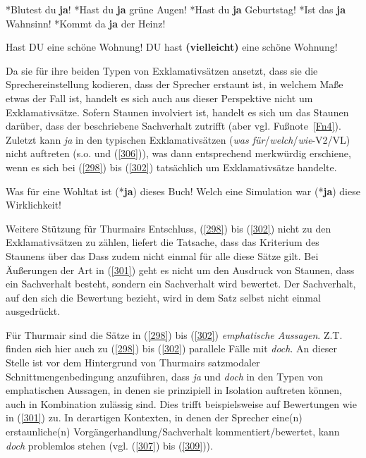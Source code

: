 \begin{exe}
	\ex\label{304} 
		\begin{xlist}	
			\ex\label{304a} *Blutest du \textbf{ja}!	
			\ex\label{304b} *Hast du \textbf{ja} grüne Augen!
			\ex\label{304c} *Hast du \textbf{ja} Geburtstag!
			\ex\label{304d} *Ist das \textbf{ja} Wahnsinn!
			\ex\label{304e} *Kommt da \textbf{ja} der Heinz!
		\end{xlist}
\end{exe}
\begin{exe}
	\ex\label{305} 
		\begin{xlist}	
			\ex\label{305a} Hast DU eine schöne Wohnung!	
			\ex\label{305b} DU hast \textbf{(vielleicht)} eine schöne Wohnung!
		\end{xlist}
\end{exe}
Da sie für ihre beiden Typen von Exklamativsätzen  ansetzt, dass sie die Sprecher\-einstellung kodieren, dass der Sprecher erstaunt ist, in welchem Maße etwas der Fall ist, handelt es sich auch aus dieser Perspektive nicht um Exklamativsätze. Sofern Staunen involviert ist, handelt es sich um das Staunen darüber, dass der beschriebene Sachverhalt zutrifft (aber vgl. Fußnote~\ref{Fn4}). Zuletzt kann \textit{ja} in den typi\-schen Exklamativsätzen (\textit{was für}/\textit{welch}/\textit{wie}-V2/VL) nicht auftreten (s.o. und (\ref{306})), was dann entsprechend merkwürdig erschiene, wenn es sich bei (\ref{298}) bis (\ref{302}) tatsächlich um Exklamativsätze handelte.

\begin{exe}
	\ex\label{306} 
		\begin{xlist}	
			\ex\label{306a} Was für eine Wohltat ist (*\textbf{ja}) dieses Buch!
			\ex\label{306b} Welch eine Simulation war (*\textbf{ja}) diese Wirklichkeit!	
			\hfill\hbox {\citet[37]{Kwon2005}}
		\end{xlist}
\end{exe}
Weitere Stützung für Thurmairs Entschluss, (\ref{298}) bis (\ref{302}) nicht zu den Exklamativsätzen zu zählen, liefert die Tatsache, dass das Kriterium des Staunens über das Dass zudem nicht einmal für alle diese Sätze gilt. Bei Äußerungen der Art in (\ref{301}) geht es nicht um den Ausdruck von Staunen, dass ein Sachverhalt besteht, sondern ein Sachverhalt wird bewertet. Der Sachverhalt, auf den sich die Be\-wertung bezieht, wird in dem Satz selbst nicht einmal ausgedrückt.
 
Für Thurmair sind die Sätze in (\ref{298}) bis (\ref{302})  \textit{emphatische Aussagen}. Z.T. finden sich hier auch zu (\ref{298}) bis (\ref{302}) parallele Fälle mit \textit{doch}. An dieser Stelle ist vor dem Hintergrund von Thurmairs satzmodaler Schnittmengenbedingung anzuführen, dass \textit{ja} und \textit{doch} in den Typen von emphatischen Aussagen, in denen sie prinzi\-piell in Isolation auftreten können, auch in Kombination zulässig sind. Dies trifft beispielsweise auf Bewertungen wie in (\ref{301}) zu. In derartigen Kontexten, in denen der Sprecher eine(n) erstaunliche(n) Vorgängerhandlung/Sachverhalt kommentiert/bewertet, kann \textit{doch} problemlos stehen (vgl. (\ref{307}) bis (\ref{309})).

